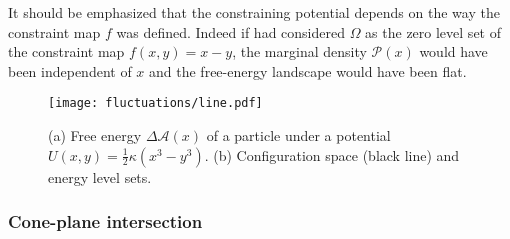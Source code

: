 \begin{subappendices}
It should be emphasized that the constraining potential depends on the way the constraint map $f$ was defined.
Indeed if had considered $\Omega$ as the zero level set of the constraint map $f(x, y) = x - y$, the marginal density $\mathscr{P}(x)$ would have been independent of $x$ and the free-energy landscape would have been flat.
%
\begin{figure}
  \begin{center}
    \texttt{[image: fluctuations/line.pdf]}
  \end{center}
  \caption{(a) Free energy $\Delta\mathscr{A}(x)$ of a particle under a potential $U(x,y) = \frac{1}{2}\kappa(x^{3}-y^{3})$. (b) Configuration space (black line) and energy level sets.}
  \label{fig:line}
\end{figure}

\subsubsection*{Cone-plane intersection}


\end{subappendices}
